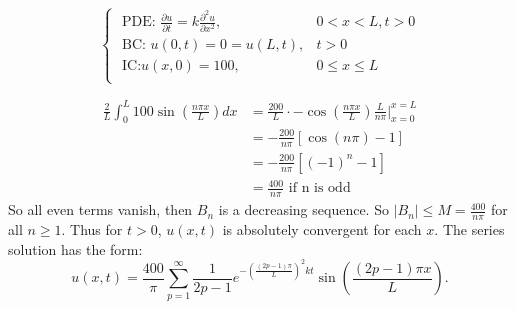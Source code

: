 \documentclass[class=article,crop=false]{standalone}
\begin{document}
\begin{eg}[]
\begin{equation*}
\begin{cases}
	\text{ PDE: } \frac{\partial u}{\partial t} = k\frac{\partial^2 u}{\partial { x}^2} , & 0<x<L,t>0 \\
	\text{ BC: } u(0,t)=0=u(L,t), & t>0\\
	\text{ IC:} u(x,0) = 100, & 0\leq x\leq L  \\
\end{cases}
\end{equation*}

\begin{align*}
	\frac{2}{L} \int_{0}^{L} 100 \sin \left( \frac{ n\pi x}{ L} \right) dx &= \frac{200}{L} \cdot  - \cos \left( \frac{ n\pi x}{ L} \right) \frac{L}{n \pi} \bigg |_{x=0}^{x=L} \\
	&= -\frac{200}{n\pi} \left[ \cos(n\pi  ) -1 \right]  \\
	&= -\frac{200}{n\pi} \left[ (-1)^{n} -1 \right] \\
	&= \frac{400}{n \pi} \text{ if n is odd} 
\end{align*}
So all even terms vanish, then $ B_n$ is a decreasing sequence. So  $ |B_n|\leq M = \frac{400}{n\pi}$ for all $ n\geq 1$.  Thus for  $ t>0$,  $ u(x,t)$ is absolutely convergent for each  $ x$. The series solution has the form:
 \[
	 u(x,t) = \frac{400}{\pi} \sum_{ p= 1}^{\infty} \frac{1}{2p-1} e^{-( \frac{ (2p-1)\pi}{L} )^2 kt} \sin \left( \frac{ (2p-1)\pi x}{ L} \right) 
.\] 
\end{eg}
\end{document}
